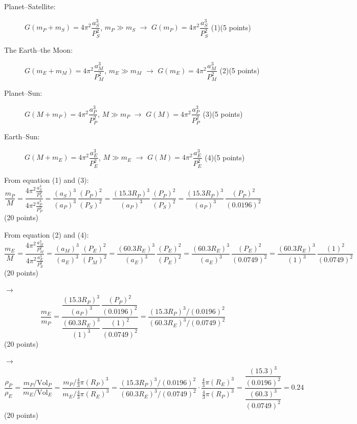 \begin{description}
\item[Planet--Satellite:]
  $G(m_P + m_S) = 4\pi^2 \dfrac{a_S^3}{P_S^2}$, $m_P \gg m_S$
  $\rightarrow$ $G(m_P) = 4\pi^2 \dfrac{a_S^3}{P_S^2}$ \hfill(1)\quad(5 points)
\item[The Earth--the Moon:]
  $G(m_E + m_M) = 4\pi^2 \dfrac{a_M^3}{P_M^2}$, $m_E \gg m_M$
  $\rightarrow$ $G(m_E) = 4\pi^2 \dfrac{a_M^3}{P_M^2}$ \hfill(2)\quad(5 points)
\item[Planet--Sun:]
  $G(M + m_P) = 4\pi^2 \dfrac{a_P^3}{P_P^2}$, $M \gg m_P$
  $\rightarrow$ $G(M) = 4\pi^2 \dfrac{a_P^3}{P_P^2}$ \hfill(3)\quad(5 points)
\item[Earth--Sun:]
  $G(M + m_E) = 4\pi^2 \dfrac{a_E^3}{P_E^2}$, $M \gg m_E$
  $\rightarrow$ $G(M) = 4\pi^2 \dfrac{a_E^3}{P_E^2}$ \hfill(4)\quad(5 points)
\end{description}

From equation (1) and (3):
\[ \frac{m_P}{M}
   = \frac{4\pi^2 \frac{a_S^3}{P_S^2}}{4\pi^2 \frac{a_P^3}{P_P^2}}
   = \frac{(a_S)^3}{(a_P)^3}\,\frac{(P_P)^2}{(P_S)^2}
   = \frac{(15.3R_P)^3}{(a_P)^3}\,\frac{(P_P)^2}{(P_S)^2}
   = \frac{(15.3R_P)^3}{(a_P)^3}\,\frac{(P_P)^2}{(0.0196)^2} \]
\hfill(20 points)

From equation (2) and (4):
\[ \frac{m_E}{M}
   = \frac{4\pi^2 \frac{a_M^3}{P_M^2}}{4\pi^2 \frac{a_E^3}{P_E^2}}
   = \frac{(a_M)^3}{(a_E)^3}\,\frac{(P_E)^2}{(P_M)^2}
   = \frac{(60.3R_E)^3}{(a_E)^3}\,\frac{(P_E)^2}{(P_E)^2}
   = \frac{(60.3R_E)^3}{(a_E)^3}\,\frac{(P_E)^2}{(0.0749)^2}
   = \frac{(60.3R_E)^3}{(1)^3}\,\frac{(1)^2}{(0.0749)^2} \]
\hfill(20 points)

$\rightarrow$
\[ \frac{m_E}{m_P}
   = \frac{\dfrac{(15.3R_P)^3}{(a_P)^3}\,\dfrac{(P_P)^2}{(0.0196)^2}}
          {\dfrac{(60.3R_E)^3}{(1)^3}\,\dfrac{(1)^2}{(0.0749)^2}}
   = \frac{(15.3R_P)^3/(0.0196)^2}{(60.3R_E)^3/(0.0749)^2} \]
\hfill(20 points)

$\rightarrow$
\[ \frac{\rho_P}{\rho_E}
   = \frac{m_P/\mathrm{Vol}_P}{m_E/\mathrm{Vol}_E}
   = \frac{m_P/\frac{4}{3}\pi(R_P)^3}{m_E/\frac{4}{3}\pi(R_E)^3}
   = \frac{(15.3R_P)^3/(0.0196)^2}{(60.3R_E)^3/(0.0749)^2}
     \cdot \frac{\frac{4}{3}\pi(R_E)^3}{\frac{4}{3}\pi(R_P)^3}
   = \frac{\dfrac{(15.3)^3}{(0.0196)^2}}{\dfrac{(60.3)^3}{(0.0749)^2}}
   = 0.24 \]
\hfill(20 points)
